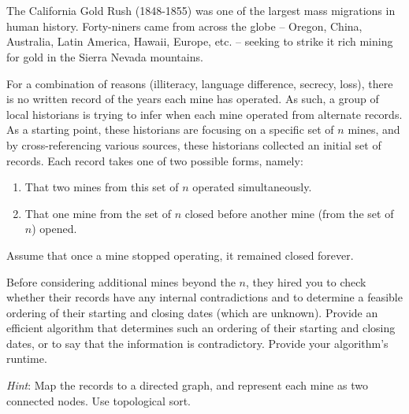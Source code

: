 \documentclass[12pt, letterpaper]{article}
\title{\ptitle{}}
\author{\pauthor{}}
\begin{document}
\maketitle

\section{}

The California Gold Rush (1848-1855) was one of the largest mass migrations in human
history. Forty-niners came from across the globe – Oregon, China, Australia, Latin America,
Hawaii, Europe, etc. – seeking to strike it rich mining for gold in the Sierra Nevada mountains.

\noindent For a combination of reasons (illiteracy, language difference, secrecy, loss), there is no written
record of the years each mine has operated. As such, a group of local historians is trying to
infer when each mine operated from alternate records. As a starting point, these historians are
focusing on a specific set of $n$ mines, and by cross-referencing various sources, these historians
collected an initial set of records. Each record takes one of two possible forms, namely:

\begin{enumerate}
    \item That two mines from this set of $n$ operated simultaneously.
    \item That one mine from the set of $n$ closed before another mine (from the set of $n$) opened.
\end{enumerate}

\noindent Assume that once a mine stopped operating, it remained closed forever.

\noindent Before considering additional mines beyond the $n$, they hired you to check whether their
records have any internal contradictions and to determine a feasible ordering of their starting
and closing dates (which are unknown). Provide an efficient algorithm that determines such
an ordering of their starting and closing dates, or to say that the information is contradictory.
Provide your algorithm's runtime.

\noindent\textit{Hint}: Map the records to a directed graph, and represent each mine as two connected nodes.
Use topological sort.

\clearpage
\end{document}
